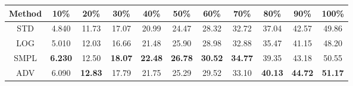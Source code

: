 \documentclass{standalone}
\begin{document}
\begin{tabular}{c|cccccccccc}
      \toprule
      Method & 10\% & 20\% & 30\% & 40\% & 50\% & 60\% & 70\% & 80\% & 90\% & 100\% \\
      \midrule
STD & 4.840 & 11.73 & 17.07 & 20.99 & 24.47 & 28.32 & 32.72 & 37.04 & 42.57 & 49.86\\
LOG & 5.010 & 12.03 & 16.66 & 21.48 & 25.90 & 28.98 & 32.88 & 35.47 & 41.15 & 48.20\\
SMPL & \textbf{6.230} & 12.50 & \textbf{18.07} & \textbf{22.48} & \textbf{26.78} & \textbf{30.52} & \textbf{34.77} & 39.35 & 43.18 & 50.55\\
ADV & 6.090 & \textbf{12.83} & 17.79 & 21.75 & 25.29 & 29.52 & 33.10 & \textbf{40.13} & \textbf{44.72} & \textbf{51.17}\\
  \bottomrule
\end{tabular}
\end{document}
